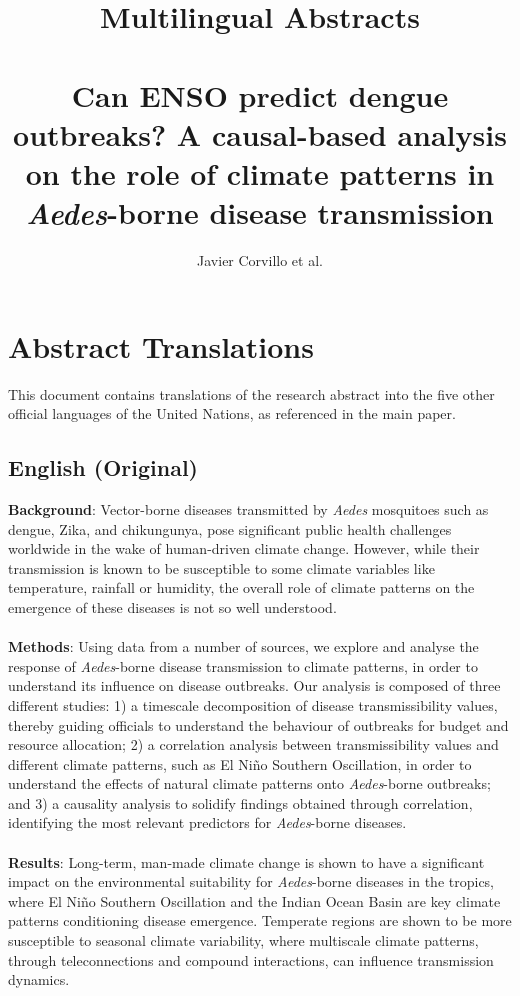 \documentclass[10pt]{article}
\title{Multilingual Abstracts\\ \\
Can ENSO predict dengue outbreaks? A causal-based analysis on the role of climate patterns in \textit{Aedes}-borne disease transmission}
\author{Javier Corvillo et al.}
\begin{document}
\section*{Abstract Translations}

This document contains translations of the research abstract into the five other official languages of the United Nations, as referenced in the main paper.

\subsection*{English (Original)}

\textbf{Background}: Vector-borne diseases transmitted by \textit{Aedes} mosquitoes such as dengue, Zika, and chikungunya, pose significant public health challenges worldwide in the wake of human-driven climate change. However, while their transmission is known to be susceptible to some climate variables like temperature, rainfall or humidity, the overall role of climate patterns on the emergence of these diseases is not so well understood.
\\
\\
\textbf{Methods}: Using data from a number of sources, we explore and analyse the response of \textit{Aedes}-borne disease transmission to climate patterns, in order to understand its influence on disease outbreaks. Our analysis is composed of three different studies: 1) a timescale decomposition of disease transmissibility values, thereby guiding officials to understand the behaviour of outbreaks for budget and resource allocation; 2) a correlation analysis between transmissibility values and different climate patterns, such as El Niño Southern Oscillation, in order to understand the effects of natural climate patterns onto \textit{Aedes}-borne outbreaks; and 3) a causality analysis to solidify findings obtained through correlation, identifying the most relevant predictors for \textit{Aedes}-borne diseases.
\\
\\
\textbf{Results}: Long-term, man-made climate change is shown to have a significant impact on the environmental suitability for \textit{Aedes}-borne diseases in the tropics, where El Niño Southern Oscillation and the Indian Ocean Basin are key climate patterns conditioning disease emergence. Temperate regions are shown to be more susceptible to seasonal climate variability, where multiscale climate patterns, through teleconnections and compound interactions, can influence transmission dynamics.
\end{document}
